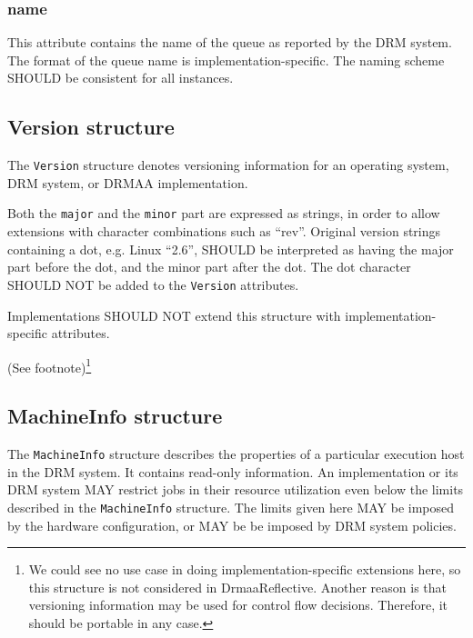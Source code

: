 \documentclass{article}
\newcommand{\h}[1]{\lstinline|#1|}
\newcommand{\rat}[1]{ {\tiny(See footnote)}\footnote{#1} }
\begin{document}


\subsubsection{name}

This attribute contains the name of the queue as reported by the DRM system. The format of the queue name is implementation-specific. The naming scheme SHOULD be consistent for all instances.

\subsection{Version structure}
\label{sec:version}

The \h{Version} structure denotes versioning information for an operating system, DRM system, or DRMAA implementation. 



Both the \h{major} and the \h{minor} part are expressed as strings, in order to allow extensions with character combinations such as \enquote{rev}. Original version strings containing a dot, e.g. Linux \enquote{2.6}, SHOULD be interpreted as having the major part before the dot, and the minor part after the dot. The dot character SHOULD NOT be added to the \h{Version} attributes. 

Implementations SHOULD NOT extend this structure with implementation-specific attributes.

\rat{
We could see no use case in doing implementation-specific extensions here, so this structure is not considered in DrmaaReflective. Another reason is that versioning information may be used for control flow decisions. Therefore, it should be portable in any case. 
}

\subsection{MachineInfo structure}
\label{sec:machine}

The \h{MachineInfo} structure describes the properties of a particular execution host in the DRM system. It contains read-only information. An implementation or its DRM system MAY restrict jobs in their resource utilization even below the limits described in the \h{MachineInfo} structure. The limits given here MAY be imposed by the hardware configuration, or MAY be be imposed by DRM system policies.
\end{document}
